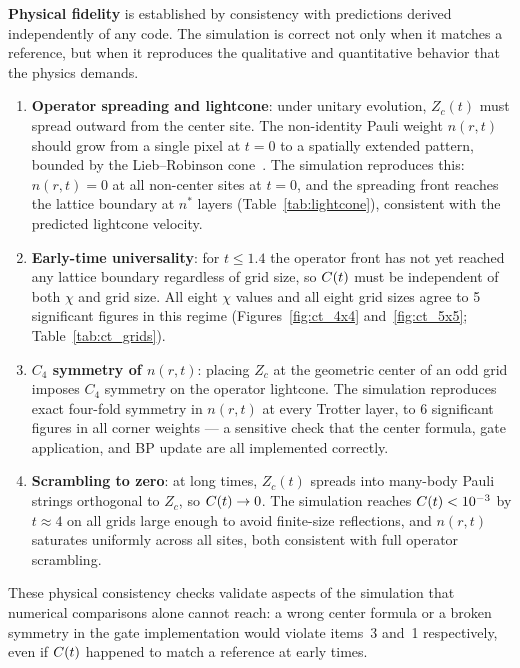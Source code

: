 \medskip
\noindent\textbf{Physical fidelity} is established by consistency with predictions
derived independently of any code.
The simulation is correct not only when it matches a reference, but when it
reproduces the qualitative and quantitative behavior that the physics demands.
\begin{enumerate}
  \item \textbf{Operator spreading and lightcone}: under unitary evolution,
        $Z_c(t)$ must spread outward from the center site.
        The non-identity Pauli weight $n(r,t)$ should grow from a single pixel
        at $t=0$ to a spatially extended pattern, bounded by the Lieb--Robinson
        cone~\citep{liebrobinson}.
        The simulation reproduces this: $n(r,t)=0$ at all non-center sites at
        $t=0$, and the spreading front reaches the lattice boundary at
        $n^*$ layers (Table~\ref{tab:lightcone}), consistent with the predicted
        lightcone velocity.
  \item \textbf{Early-time universality}: for $t \leq 1.4$ the operator front
        has not yet reached any lattice boundary regardless of grid size, so
        $C(t)$ must be independent of both $\chi$ and grid size.
        All eight $\chi$ values and all eight grid sizes agree to 5 significant
        figures in this regime (Figures~\ref{fig:ct_4x4} and~\ref{fig:ct_5x5}; Table~\ref{tab:ct_grids}).
  \item \textbf{$C_4$ symmetry of $n(r,t)$}: placing $Z_c$ at the geometric
        center of an odd grid imposes $C_4$ symmetry on the operator lightcone.
        The simulation reproduces exact four-fold symmetry in $n(r,t)$ at every
        Trotter layer, to 6 significant figures in all corner weights --- a
        sensitive check that the center formula, gate application, and BP update
        are all implemented correctly.
  \item \textbf{Scrambling to zero}: at long times, $Z_c(t)$ spreads into
        many-body Pauli strings orthogonal to $Z_c$, so $C(t) \to 0$.
        The simulation reaches $C(t) < 10^{-3}$ by $t \approx 4$ on all grids
        large enough to avoid finite-size reflections, and $n(r,t)$ saturates
        uniformly across all sites, both consistent with full operator scrambling.
\end{enumerate}
These physical consistency checks validate aspects of the simulation that
numerical comparisons alone cannot reach: a wrong center formula or a broken
symmetry in the gate implementation would violate items~3 and~1 respectively,
even if $C(t)$ happened to match a reference at early times.

